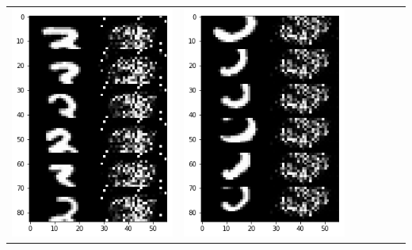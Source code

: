 \documentclass[12pt]{report} %
\begin{document}
\begin{tabular}{m{0.7cm}m{2.4cm}m{2.4cm}m{2.4cm}m{2.4cm}m{2.4cm}m{2.4cm}}
	\includegraphics[scale=0.3]{pictures/M2_3_up.png} & \includegraphics[scale=0.3]{pictures/M2_3_down.png}\\

\end{tabular}
\end{document}
